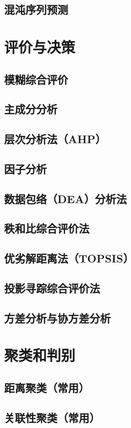 \documentclass[openany]{progbookcn}
\begin{document}
\section{混沌序列预测}
\chapter{评价与决策}
\section{模糊综合评价}
\section{主成分分析}
\section{层次分析法（AHP）}
\section{因子分析}
\section{数据包络（DEA）分析法}
\section{秩和比综合评价法}
\section{优劣解距离法（TOPSIS）}
\section{投影寻踪综合评价法}
\section{方差分析与协方差分析}
\chapter{聚类和判别}
\section{距离聚类（常用）}
\section{关联性聚类（常用）}
\end{document}
